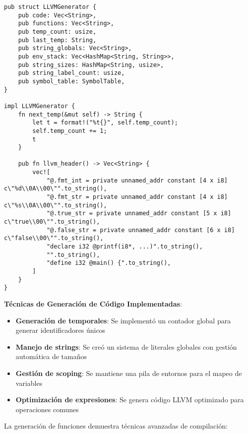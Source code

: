 \documentclass[12pt,a4paper]{article}
\begin{document}
\begin{lstlisting}[style=rustcode,caption=Generador LLVM principal]
pub struct LLVMGenerator {
    pub code: Vec<String>,
    pub functions: Vec<String>,
    pub temp_count: usize,
    pub last_temp: String,
    pub string_globals: Vec<String>,
    pub env_stack: Vec<HashMap<String, String>>,
    pub string_sizes: HashMap<String, usize>,
    pub string_label_count: usize,
    pub symbol_table: SymbolTable,
}

impl LLVMGenerator {
    fn next_temp(&mut self) -> String {
        let t = format!("%t{}", self.temp_count);
        self.temp_count += 1;
        t
    }

    pub fn llvm_header() -> Vec<String> {
        vec![
            "@.fmt_int = private unnamed_addr constant [4 x i8] c\"%d\\0A\\00\"".to_string(),
            "@.fmt_str = private unnamed_addr constant [4 x i8] c\"%s\\0A\\00\"".to_string(),
            "@.true_str = private unnamed_addr constant [5 x i8] c\"true\\00\"".to_string(),
            "@.false_str = private unnamed_addr constant [6 x i8] c\"false\\00\"".to_string(),
            "declare i32 @printf(i8*, ...)".to_string(),
            "".to_string(),
            "define i32 @main() {".to_string(),
        ]
    }
}
\end{lstlisting}

\textbf{Técnicas de Generación de Código Implementadas}:
\begin{itemize}
    \item \textbf{Generación de temporales}: Se implementó un contador global para generar identificadores únicos
    \item \textbf{Manejo de strings}: Se creó un sistema de literales globales con gestión automática de tamaños
    \item \textbf{Gestión de scoping}: Se mantiene una pila de entornos para el mapeo de variables
    \item \textbf{Optimización de expresiones}: Se genera código LLVM optimizado para operaciones comunes
\end{itemize}

La generación de funciones demuestra técnicas avanzadas de compilación:
\end{document}
